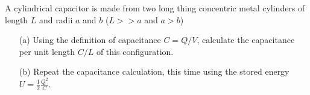 \documentclass[11pt,letterpaper,boxed]{hmcpset}
\begin{document}
\begin{solution}
\vfill
\end{solution}
\newpage

\begin{problem}
A cylindrical capacitor is made from two long thing concentric metal cylinders of length $L$ and radii $a$ and $b$ ($L >> a$ and $a>b$)
\begin{enumerate}
\item[(a)] Using the definition of capacitance $C = Q/V$, calculate the capacitance per unit length $C/L$ of this configuration. 
\item[(b)] Repeat the capacitance calculation, this time using the stored energy $U =\frac{1}{2}\frac{Q^2}{C}$.
\end{enumerate}
\end{problem}

\begin{solution}
\vfill
\end{solution}
\end{document}
